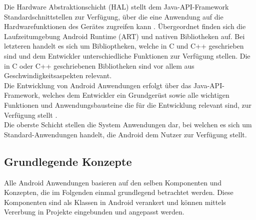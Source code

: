 Die Hardware Abstraktionschicht (HAL) stellt dem Java-API-Framework Standardschnittstellen zur Verfügung, über die eine Anwendung auf die Hardwarefunktionen des Gerätes zugreifen kann \citep{android:architecture}.
Übergeordnet finden sich die Laufzeitumgebung Android Runtime (ART) und nativen Bibliotheken auf. Bei letzteren handelt es sich um Biblioptheken, welche in C und C++ geschrieben sind \citep{android:architecture} und dem Entwickler unterschiedliche Funktionen zur Verfügung stellen. Die in C oder C++ geschriebenen Bibliotheken sind vor allem aus Geschwindigkeitsaspekten relevant. \\
Die Entwicklung von Android Anwendungen erfolgt über das Java-API-Framework, welches dem Entwickler ein Grundgerüst sowie alle wichtigen Funktionen und Anwendungsbausteine die für die Entwicklung relevant sind, zur Verfügung stellt \citep{android:architecture}.\\
Die oberste Schicht stellen die System Anwendungen dar, bei welchen es sich um Standard-Anwendungen handelt, die Android dem Nutzer zur Verfügung stellt.

\subsection{Grundlegende Konzepte}
Alle Android Anwendungen basieren auf den selben Komponenten und Konzepten, die im Folgenden einmal grundlegend betrachtet werden. Diese Komponenten sind als Klassen in Android verankert und können mittels Vererbung in Projekte eingebunden und angepasst werden.

